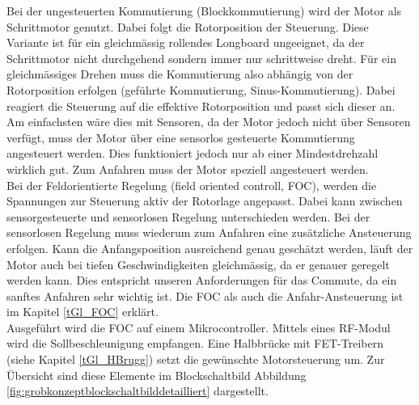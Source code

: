 Bei der ungesteuerten Kommutierung (Blockkommutierung) wird der Motor als Schrittmotor genutzt. Dabei folgt die Rotorposition der Steuerung. Diese Variante ist für ein gleichmässig rollendes Longboard ungeeignet, da der Schrittmotor nicht durchgehend sondern immer nur schrittweise dreht. Für ein gleichmässiges Drehen muss die Kommutierung also abhängig von der Rotorposition erfolgen (geführte Kommutierung, Sinus-Kommutierung). Dabei reagiert die Steuerung auf die effektive Rotorposition und passt sich dieser an. Am einfachsten wäre dies mit Sensoren, da der Motor jedoch nicht über Sensoren verfügt, muss der Motor über eine sensorlos gesteuerte Kommutierung angesteuert werden. Dies funktioniert jedoch nur ab einer Mindestdrehzahl wirklich gut. Zum Anfahren muss der Motor speziell angesteuert werden. \\
Bei der Feldorientierte Regelung (field oriented controll, FOC), werden die Spannungen zur Steuerung aktiv der Rotorlage angepasst. Dabei kann zwischen sensorgesteuerte und sensorlosen Regelung unterschieden werden. Bei der sensorlosen Regelung muss wiederum zum Anfahren eine zusätzliche Ansteuerung erfolgen. Kann die Anfangsposition ausreichend genau geschätzt werden, läuft der Motor auch bei tiefen Geschwindigkeiten gleichmässig, da er genauer geregelt werden kann. Dies entspricht unseren Anforderungen für das Commute, da ein sanftes Anfahren sehr wichtig ist. Die FOC als auch die Anfahr-Ansteuerung ist im Kapitel \ref{tGl_FOC} erklärt.\\
Ausgeführt wird die FOC auf einem Mikrocontroller. Mittels eines RF-Modul wird die Sollbeschleunigung empfangen. Eine Halbbrücke mit FET-Treibern (siehe Kapitel \ref{tGl_HBrugg}) setzt  die gewünschte Motorsteuerung um. Zur Übersicht sind diese Elemente im Blockschaltbild Abbildung \ref{fig:grobkonzeptblockschaltbilddetailliert} dargestellt. 

